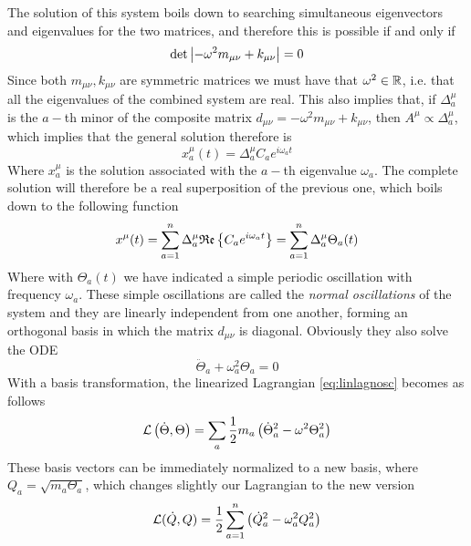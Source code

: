 \documentclass[../admech.tex]{subfiles}
\begin{document}
The solution of this system boils down to searching simultaneous eigenvectors and eigenvalues for the two matrices, and therefore this is possible if and only if
\begin{equation}
	\det\abs{-\omega^2m_{\mu\nu}+k_{\mu\nu}}=0
	\label{eq:oscsistsolcond}
\end{equation}
Since both $m_{\mu\nu},k_{\mu\nu}$ are symmetric matrices we must have that $\omega^2\in\operatorname{\mathbb{R}}$, i.e. that all the eigenvalues of the combined system are real. This also implies that, if $\Delta_a^\mu$ is the $a-$th minor of the composite matrix $d_{\mu\nu}=-\omega^2m_{\mu\nu}+k_{\mu\nu}$, then $A^\mu\propto\Delta^\mu_a$, which implies that the general solution therefore is
\begin{equation}
	x_a^\mu(t)=\Delta^\mu_aC_ae^{i\omega_at}
	\label{eq:athsol}
\end{equation}
Where $x_a^\mu$ is the solution associated with the $a-$th eigenvalue $\omega_a$. The complete solution will therefore be a real superposition of the previous one, which boils down to the following function
\begin{equation}
	x^\mu(t)=\sum_{a=1}^n\Delta^\mu_a\mathfrak{Re}\left\{ C_ae^{i\omega_at} \right\}=\sum_{a=1}^n\Delta^\mu_a\Theta_a(t)
	\label{eq:completesol}
\end{equation}
Where with $\Theta_a(t)$ we have indicated a simple periodic oscillation with frequency $\omega_a$. These simple oscillations are called the \emph{normal oscillations} of the system and they are linearly independent from one another, forming an orthogonal basis in which the matrix $d_{\mu\nu}$ is diagonal. Obviously they also solve the ODE
\begin{equation}
	\ddot{\Theta}_a+\omega^2_a\Theta_a=0
	\label{eq:normODE}
\end{equation}
With a basis transformation, the linearized Lagrangian \eqref{eq:linlagnosc} becomes as follows
\begin{equation}
	\mathcal{L}\left( \dot{\Theta},\Theta \right)=\sum_a\frac{1}{2}m_a\left( \dot{\Theta}_a^2-\omega^2\Theta_a^2 \right)
	\label{eq:diaglagosc}
\end{equation}
These basis vectors can be immediately normalized to a new basis, where $Q_a=\sqrt{m_a\Theta_a}$, which changes slightly our Lagrangian to the new version
\begin{equation}
	\mathcal{L}(\dot{Q},Q)=\frac{1}{2}\sum_{a=1}^n\left( \dot{Q}_a^2-\omega^2_aQ_a^2 \right)
	\label{eq:normosclag}
\end{equation}
\end{document}
